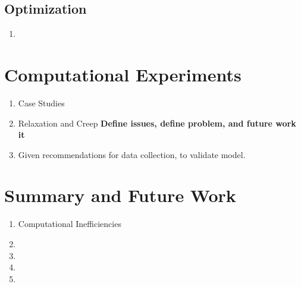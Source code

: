 \documentclass[11pt]{article}
\begin{document}
\subsection{Optimization}
	\begin{enumerate}
		\item
	\end{enumerate}

		 
\section{Computational Experiments}
	\begin{enumerate}

		\item Case Studies
		
		\item Relaxation and Creep \textbf{Define issues, define problem, and future work it}
		
		\item Given recommendations for data collection, to validate model.
		
	\end{enumerate}
	
	
		
\section{Summary and Future Work}
	\begin{enumerate}
	
		
		
		\item Computational Inefficiencies 
				
		\item 
		
		\item 
		
		\item 
		
		\item 
		
	\end{enumerate}
	

\vfill\pagebreak

	
	



		

	
\end{document}
